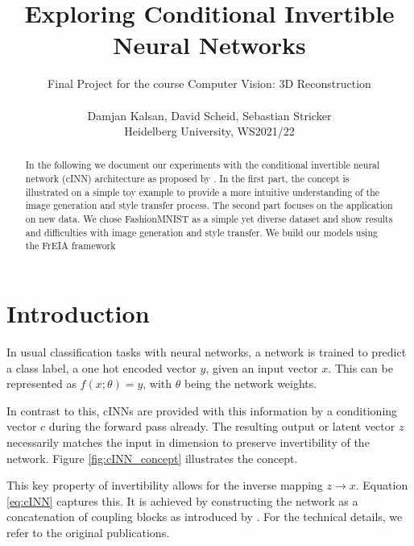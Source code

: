 \documentclass[final]{cvpr}
\begin{document}
\title{Exploring Conditional Invertible Neural Networks \\}

\author{
Final Project for the course Computer Vision: 3D Reconstruction\\\\
Damjan Kalsan, David Scheid, Sebastian Stricker\\
Heidelberg University, WS2021/22\\
}

\maketitle


\begin{abstract}
   In the following we document our experiments with the conditional invertible neural network (cINN) architecture as proposed by \cite{main_paper_CINN}.
   In the first part, the concept is illustrated on a simple toy example to provide a more intuitive understanding of the image generation and style transfer process.
   The second part focuses on the application on new data. We chose FashionMNIST \cite{fashion_mnist} as a simple yet diverse dataset and show results and difficulties with image generation and style transfer.
   We build our models using the FrEIA framework \cite{freia}
\end{abstract}

\section{Introduction}
In usual classification tasks with neural networks, a network is trained to predict a class label, a one hot encoded vector $y$, given an input vector $x$. This can be represented as $f(x; \theta) = y$, with $\theta$ being the network weights.

In contrast to this, cINNs are provided with this information by a conditioning vector $c$ during the forward pass already. The resulting output or latent vector $z$ necessarily matches the input in dimension to preserve invertibility of the network. Figure \ref{fig:cINN_concept} illustrates the concept.

This key property of invertibility allows for the inverse mapping  $z \rightarrow x$. Equation \ref{eq:cINN} captures this. It is achieved by constructing the network as a concatenation of coupling blocks as introduced by \cite{RealNVP}.
For the technical details, we refer to the original publications.
\end{document}
